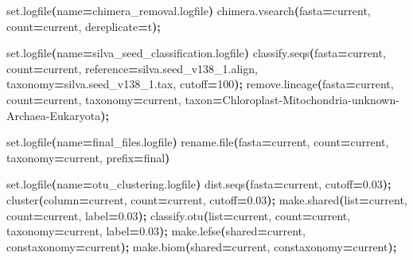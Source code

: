 \documentclass[
  12pt,
  openany]{book}
\newenvironment{Shaded}{\begin{snugshade}}{\end{snugshade}}
\newcommand{\ErrorTok}[1]{\textcolor[rgb]{0.64,0.00,0.00}{\textbf{#1}}}
\newcommand{\ExtensionTok}[1]{#1}
\newcommand{\KeywordTok}[1]{\textcolor[rgb]{0.13,0.29,0.53}{\textbf{#1}}}
\newcommand{\NormalTok}[1]{#1}
\newcommand{\OperatorTok}[1]{\textcolor[rgb]{0.81,0.36,0.00}{\textbf{#1}}}
\newcommand{\VariableTok}[1]{\textcolor[rgb]{0.00,0.00,0.00}{#1}}
\begin{document}
\begin{Shaded}
\begin{Highlighting}[]
\ExtensionTok{set.logfile}\ErrorTok{(}\VariableTok{name}\OperatorTok{=}\NormalTok{chimera\_removal.logfile}\KeywordTok{)}
\ExtensionTok{chimera.vsearch}\ErrorTok{(}\VariableTok{fasta}\OperatorTok{=}\NormalTok{current, }\VariableTok{count}\OperatorTok{=}\NormalTok{current, }\VariableTok{dereplicate}\OperatorTok{=}\NormalTok{t}\KeywordTok{);}

\ExtensionTok{set.logfile}\ErrorTok{(}\VariableTok{name}\OperatorTok{=}\NormalTok{silva\_seed\_classification.logfile}\KeywordTok{)}
\ExtensionTok{classify.seqs}\ErrorTok{(}\VariableTok{fasta}\OperatorTok{=}\NormalTok{current, }\VariableTok{count}\OperatorTok{=}\NormalTok{current, }\VariableTok{reference}\OperatorTok{=}\NormalTok{silva.seed\_v138\_1.align, }\VariableTok{taxonomy}\OperatorTok{=}\NormalTok{silva.seed\_v138\_1.tax, }\VariableTok{cutoff}\OperatorTok{=}\NormalTok{100}\KeywordTok{);}
\ExtensionTok{remove.lineage}\ErrorTok{(}\VariableTok{fasta}\OperatorTok{=}\NormalTok{current, }\VariableTok{count}\OperatorTok{=}\NormalTok{current, }\VariableTok{taxonomy}\OperatorTok{=}\NormalTok{current, }\VariableTok{taxon}\OperatorTok{=}\NormalTok{Chloroplast{-}Mitochondria{-}unknown{-}Archaea{-}Eukaryota}\KeywordTok{);}

\ExtensionTok{set.logfile}\ErrorTok{(}\VariableTok{name}\OperatorTok{=}\NormalTok{final\_files.logfile}\KeywordTok{)}
\ExtensionTok{rename.file}\ErrorTok{(}\VariableTok{fasta}\OperatorTok{=}\NormalTok{current, }\VariableTok{count}\OperatorTok{=}\NormalTok{current, }\VariableTok{taxonomy}\OperatorTok{=}\NormalTok{current, }\VariableTok{prefix}\OperatorTok{=}\NormalTok{final}\KeywordTok{)}

\ExtensionTok{set.logfile}\ErrorTok{(}\VariableTok{name}\OperatorTok{=}\NormalTok{otu\_clustering.logfile}\KeywordTok{)}
\ExtensionTok{dist.seqs}\ErrorTok{(}\VariableTok{fasta}\OperatorTok{=}\NormalTok{current, }\VariableTok{cutoff}\OperatorTok{=}\NormalTok{0.03}\KeywordTok{);}
\ExtensionTok{cluster}\ErrorTok{(}\VariableTok{column}\OperatorTok{=}\NormalTok{current, }\VariableTok{count}\OperatorTok{=}\NormalTok{current, }\VariableTok{cutoff}\OperatorTok{=}\NormalTok{0.03}\KeywordTok{);}
\ExtensionTok{make.shared}\ErrorTok{(}\VariableTok{list}\OperatorTok{=}\NormalTok{current, }\VariableTok{count}\OperatorTok{=}\NormalTok{current, }\VariableTok{label}\OperatorTok{=}\NormalTok{0.03}\KeywordTok{);}
\ExtensionTok{classify.otu}\ErrorTok{(}\VariableTok{list}\OperatorTok{=}\NormalTok{current, }\VariableTok{count}\OperatorTok{=}\NormalTok{current, }\VariableTok{taxonomy}\OperatorTok{=}\NormalTok{current, }\VariableTok{label}\OperatorTok{=}\NormalTok{0.03}\KeywordTok{);}
\ExtensionTok{make.lefse}\ErrorTok{(}\VariableTok{shared}\OperatorTok{=}\NormalTok{current, }\VariableTok{constaxonomy}\OperatorTok{=}\NormalTok{current}\KeywordTok{);}
\ExtensionTok{make.biom}\ErrorTok{(}\VariableTok{shared}\OperatorTok{=}\NormalTok{current, }\VariableTok{constaxonomy}\OperatorTok{=}\NormalTok{current}\KeywordTok{);}


\end{Highlighting}
\end{Shaded}
\end{document}
